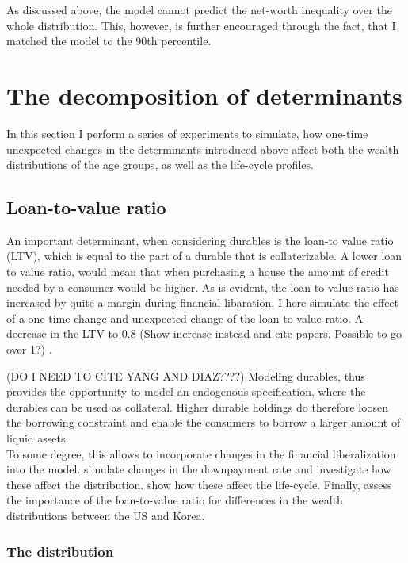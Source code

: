 \documentclass[a4paper,12pt,legno]{article}
\begin{document}
As discussed above, the model cannot predict the net-worth inequality over the whole distribution. This, however, is further encouraged through the fact, that I matched the model to the 90th percentile. 

\section{The decomposition of determinants}
In this section I perform a series of experiments to simulate, how one-time unexpected changes in the determinants introduced above affect both the wealth distributions of the age groups, as well as the life-cycle profiles. 

\subsection{Loan-to-value ratio}
An important determinant, when considering durables is the loan-to value ratio (LTV), which is equal to the part of a durable that is collaterizable. A lower loan to value ratio, would mean that when purchasing a house the amount of credit needed by a consumer would be higher. As is evident, the loan to value ratio has increased by quite a margin during financial libaration. I here simulate the effect of a one time change and unexpected change of the loan to value ratio. A decrease in the LTV to 0.8 (Show increase instead and cite papers. Possible to go over 1?) . 

(DO I NEED TO CITE YANG AND DIAZ????) 
Modeling durables, thus provides the opportunity to model an endogenous specification, where the durables can be used as collateral. Higher durable holdings do therefore loosen the borrowing constraint and enable the consumers to borrow a larger amount of liquid assets. \\ To some degree, this allows to incorporate changes in the financial liberalization into the model. \cite{diaz2010} simulate changes in the downpayment rate and investigate how these affect the distribution. \cite{yang2009} show how these affect the life-cycle. Finally, \cite{cho2012accounting} assess the importance of the loan-to-value ratio for differences in the wealth distributions between the US and Korea. 

\subsubsection{The distribution}
\end{document}
